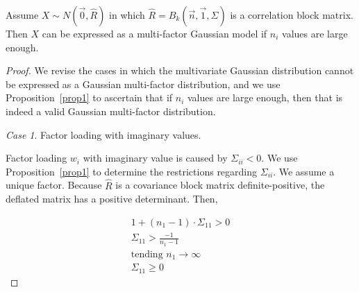 \documentclass[11pt,fleqn]{book} %
\begin{document}
\begin{proposition}
	\label{prop:gmfamgb}
	Assume $X \sim N(\vec{0},\widehat{R})$ in which 
	$\widehat{R}=B_k(\vec{n},\vec{1},\Sigma)$ is a correlation block matrix. 
	Then $X$ can be expressed as a multi-factor Gaussian model if $n_i$ 
	values are large enough.
\end{proposition}
\begin{proof}
	We revise the cases in which the multivariate Gaussian distribution cannot
	be expressed as a Gaussian multi-factor distribution, and we use 
	Proposition~\ref{prop1} to ascertain that if $n_i$ values are large enough, 
	then that is indeed a valid Gaussian multi-factor distribution.
	
	\emph{Case 1}. Factor loading with imaginary values.
	\begin{adjustwidth}{1cm}{0pt}
		Factor loading $w_i$ with imaginary value is caused by $\Sigma_{ii} < 0$. 
		We use Proposition~\ref{prop1} to determine the restrictions regarding 
		$\Sigma_{ii}$. We assume a unique factor.
		Because $\widehat{R}$ is a covariance block matrix definite-positive, 
		the deflated matrix has a positive determinant. Then,
	\end{adjustwidth}
	\begin{displaymath}
		\begin{array}{l}
			1 + (n_1-1) \cdot \Sigma_{11} > 0
			\\
			\Sigma_{11} > \frac{-1}{n_1-1} 
			\\
			\text{tending } n_1 \to \infty
			\\
			\Sigma_{11} \ge 0
		\end{array}
	\end{displaymath}
	

\end{proof}
\end{document}
